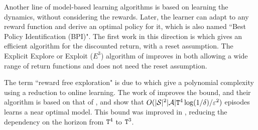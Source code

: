 Another line of model-based learning algorithms is based on learning the dynamics, without considering the rewards. Later, the learner can adapt to any reward function and derive an optimal policy for it, which is also named ``Best Policy Identification (BPI)".
The first work in this direction is \cite{Fiechter94} which gives an efficient algorithm for the discounted return, with a reset assumption.
The Explicit Explore or Exploit ($E^3$) algorithm of \cite{KearnsS02} improves in both allowing a wide range of return functions and does not need the reset assumption. 

The term ``reward free exploration" is due to \cite{JinKSY20} which give a polynomial complexity using a reduction to online learning.
The work of \cite{KaufmannMDJLV21} improves the bound, and their algorithm is based on that of  \cite{Fiechter94}, and show that $O(|\mathcal{S}|^2|\mathcal{A}|{\tt T}^4\log(1/\delta)/\varepsilon^2)$ episodes learns a near optimal model.
This bound was improved in \cite{MenardDJKLV21}, reducing the dependency on the horizon from ${\tt T}^4$ to ${\tt T}^3$.






